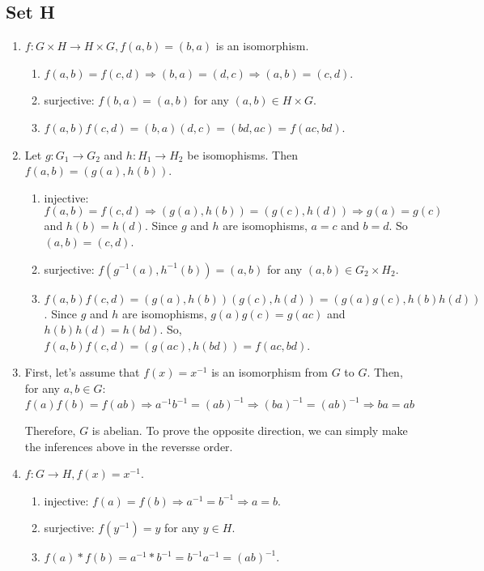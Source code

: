 \subsection{Set H}
\begin{enumerate}
    \item $ f: G \times H \to H \times G, f(a, b) = (b, a) $ is an isomorphism.
        \begin{enumerate}
            \item $ f(a, b) = f(c, d) \Rightarrow (b, a) = (d, c) \Rightarrow (a, b) = (c, d) $.

            \item surjective: $ f(b, a) = (a, b) $ for any $ (a, b) \in H \times G $.

            \item $ f(a, b)f(c, d) = (b, a)(d, c) = (bd, ac) = f(ac, bd) $.
        \end{enumerate}
    
    \item Let $ g: G_1 \to G_2 $ and $ h: H_1 \to H_2$ be isomophisms. Then $ f(a, b) = (g(a), h(b)) $.
        \begin{enumerate}
            \item injective: $ f(a, b) = f(c, d) \Rightarrow (g(a), h(b)) = (g(c), h(d)) \Rightarrow g(a) = g(c) $  and $ h(b) = h(d) $. Since $ g $ and $ h $ are isomophisms, $ a = c $ and $  b = d $. So $ (a, b) = (c, d) $.

            \item surjective: $ f(g^{-1}(a), h^{-1}(b)) = (a, b) $ for any $ (a, b) \in G _2 \times H_2 $.

            \item $ f(a, b)f(c, d) = (g(a), h(b))(g(c), h(d)) = (g(a)g(c), h(b)h(d)) $. Since $ g $ and $ h $ are isomophisms, $ g(a)g(c) = g(ac) $ and $ h(b)h(d) = h(bd) $. So, $ f(a, b)f(c, d) = (g(ac), h(bd)) = f(ac, bd) $.
        \end{enumerate}

    \item First, let's assume that $ f(x) = x^{-1} $ is an isomorphism from $ G $ to $ G $. Then, for any $ a, b \in G $:
    $$
        f(a)f(b) = f(ab) \Rightarrow a^{-1}b^{-1} = (ab)^{-1} \Rightarrow (ba)^{-1} = (ab)^{-1} \Rightarrow ba = ab
    $$

    Therefore, $ G $ is abelian. To prove the opposite direction, we can simply make the inferences above in the reversse order.

    \item $ f: G \to H, f(x) = x^{-1} $.
        \begin{enumerate}
            \item injective: $ f(a) = f(b) \Rightarrow a^{-1} = b^{-1} \Rightarrow a = b $.

            \item surjective: $ f(y^{-1}) = y $ for any $ y \in H $.

            \item $ f(a) * f(b) =a^{-1} * b^{-1} = b^{-1}a^{-1} = (ab)^{-1} $.
        \end{enumerate}
\end{enumerate}
    

